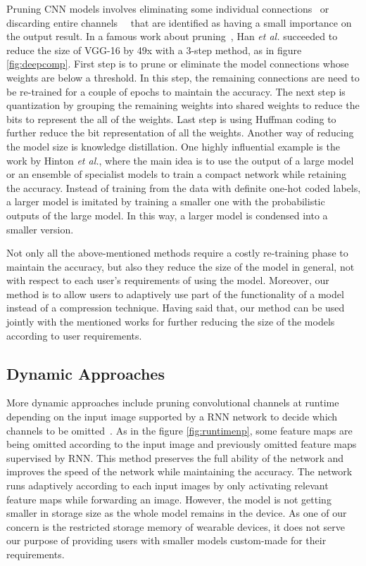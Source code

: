 Pruning CNN models involves eliminating some individual connections~\cite{molchanov2016pruning} \cite{Yu_2018_CVPR} \cite{Wang2018StructuredPP} or discarding entire channels~\cite{He_2017_ICCV}~\cite{li2016pruning} that are identified as having a small importance on the output result.
In a famous work about pruning~\cite{han2015deep}, Han \emph{et al.} succeeded to reduce the size of VGG-16 by 49x with a 3-step method, as in figure \ref{fig:deepcomp}. 
First step is to prune or eliminate the model connections whose weights are below a threshold. 
In this step, the remaining connections are need to be re-trained for a couple of epochs to maintain the accuracy.
The next step is quantization by grouping the remaining weights into shared weights to reduce the bits to represent the all of the weights.
Last step is using Huffman coding to further reduce the bit representation of all the weights. 
Another way of reducing the model size is knowledge distillation. 
One highly influential example is the work by Hinton \emph{et al.}, where the main idea is to use the output of a large model or an ensemble of specialist models to train a compact network while retaining the accuracy.
Instead of training from the data with definite one-hot coded labels, a larger model is imitated by training a smaller one with the probabilistic outputs of the large model.
In this way, a larger model is condensed into a smaller version.

Not only all the above-mentioned methods require a costly re-training phase to maintain the accuracy,
but also they reduce the size of the model in general, not with respect to each user's requirements of using the model. 
Moreover, our method is to allow users to adaptively use part of the functionality of a model instead of a compression technique.
Having said that, our method can be used jointly with the mentioned works for further reducing the size of the models according to user requirements.

\subsection{Dynamic Approaches}

More dynamic approaches include pruning convolutional channels at runtime depending on the input image supported by a RNN network to decide which channels to be omitted~\cite{Lin2017RuntimeNP}. 
As in the figure \ref{fig:runtimenp}, some feature maps are being omitted according to the input image and previously omitted feature maps supervised by RNN.
This method preserves the full ability of the network and improves the speed of the network while maintaining the accuracy. 
The network runs adaptively according to each input images by only activating relevant feature maps while forwarding an image.
However, the model is not getting smaller in storage size as the whole model remains in the device. 
As one of our concern is the restricted storage memory of wearable devices, it does not serve our purpose of providing users with smaller models custom-made for their requirements. 

